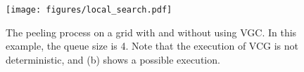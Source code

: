 \begin{figure}[t]
  \centering
  \texttt{[image: figures/local\_search.pdf]}
  \caption{The peeling process on a grid with and without using VGC.
  In this example, the queue size is 4.
  Note that the execution of VCG is not deterministic, and (b) shows a possible execution.}\label{fig:localsearch}
\end{figure} 